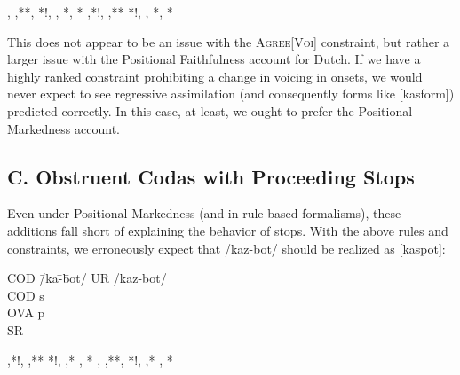 \documentclass[doc,12pt]{apa6}
\begin{document}
\begin{center}
\begin{OTtableau}{4}
	 {  ,  ,**,  }
	 {*!,  , *, *}
	 {  ,*!,  ,**}
	 {*!,  , *, *}
\end{OTtableau}
\end{center}

\noindent

This does not appear to be an issue with the \textsc{Agree[Voi]} constraint,
but rather a larger issue with the Positional Faithfulness account for Dutch.
If we have a highly ranked constraint prohibiting a change in voicing in
onsets, we would never expect to see regressive assimilation (and consequently
forms like [kasform]) predicted correctly. In this case, at least, we ought to
prefer the Positional Markedness account.

\subsection{C. Obstruent Codas with Proceeding Stops}

Even under Positional Markedness (and in rule-based formalisms), these
additions fall short of explaining the behavior of stops. With the above rules
and constraints, we erroneously expect that /kaz-bot/ should be realized as
[kaspot]:

\begin{minipage}{\textwidth}
\begin{exe}
	\ex \begin{tabbing}
		COD \= /ka\=-\=bot/ \kill
		UR  \> /kaz-bot/ \\
		COD \> \>s \\
		OVA \> \> \>p \\
		SR \> [kaspot]
		\end{tabbing}
\end{exe}
\end{minipage}

\begin{center}
\begin{OTtableau}{4}
	 {  ,*!,  ,**}
	 {*!,  ,* , *}
	 {  ,  ,**, }
	 {*!,  ,* , *}
\end{OTtableau}
\end{center}
\end{document}
